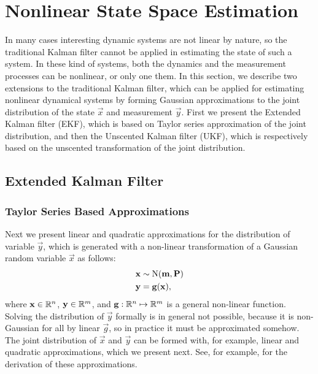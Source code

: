 %
\chapter{Nonlinear State Space Estimation}
\label{ch:nonlinear-estimation}
%

In many cases interesting dynamic systems are not linear by nature, so the
traditional Kalman filter cannot be applied in estimating the state of such a
system. In these kind of systems, both the dynamics and the measurement processes
can be nonlinear, or only one them. In this section, we describe two extensions
to the traditional Kalman filter, which can be applied for estimating nonlinear
dynamical systems by forming Gaussian approximations to the joint distribution of
the state $\vec{x}$ and measurement $\vec{y}$. First we present the Extended Kalman
filter (EKF), which is based on Taylor series approximation of the joint
distribution, and then the Unscented Kalman filter (UKF), which is
respectively based on the unscented transformation of the joint distribution.      


%


\section{Extended Kalman Filter}


\subsection{Taylor Series Based Approximations}

Next we present linear and quadratic approximations for the
distribution of variable $\vec{y}$, which is generated with a non-linear transformation
of a Gaussian random variable $\vec{x}$ as follows:
%
\begin{equation}
\begin{split}
  \mathbf{x} &\sim \operatorname{N}(\mathbf{m},\mathbf{P}) \\
  \mathbf{y} &= \mathbf{g}(\mathbf{x}),
\end{split}
\label{eq:trans_g}
\end{equation}
%
where $\mathbf{x} \in \mathbb{R}^n$, $\mathbf{y} \in \mathbb{R}^m$, and $\mathbf{g} :
\mathbb{R}^n \mapsto \mathbb{R}^m$ is a general non-linear function. Solving
the distribution of $\vec{y}$ formally is in general not possible,
because it is non-Gaussian for all by linear $\vec{g}$, so in practice
it must be approximated somehow. The joint distribution of $\vec{x}$
and $\vec{y}$ can be formed with, for example, linear and quadratic
approximations, which we present next. See, for example, \citet{Bar-Shalom+Li+Kirubarajan:2001} for the derivation of these approximations.

